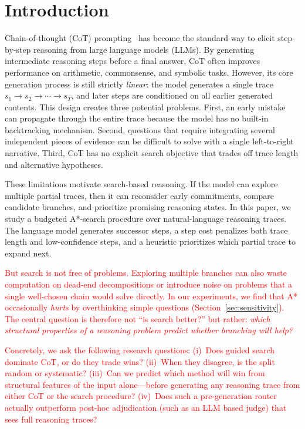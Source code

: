 \documentclass[11pt]{article}
\begin{document}
\section{Introduction}
\label{sec:intro}

Chain-of-thought (CoT) prompting~\cite{wei2022chain} has become the standard way to elicit step-by-step reasoning from large language models (LLMs). By generating intermediate reasoning steps before a final answer, CoT often improves performance on arithmetic, commonsense, and symbolic tasks. However, its core generation process is still strictly \emph{linear}: the model generates a single trace $s_1 \rightarrow s_2 \rightarrow \cdots \rightarrow s_T$, and later steps are conditioned on all earlier generated contents. This design creates three potential problems. First, an early mistake can propagate through the entire trace because the model has no built-in backtracking mechanism. Second, questions that require integrating several independent pieces of evidence can be difficult to solve with a single left-to-right narrative. Third, CoT has no explicit search objective that trades off trace length and alternative hypotheses.

These limitations motivate search-based reasoning. If the model can explore multiple partial traces, then it can reconsider early commitments, compare candidate branches, and prioritize promising reasoning states. In this paper, we study a budgeted A*-search procedure over natural-language reasoning traces. The language model generates successor steps, a step cost penalizes both trace length and low-confidence steps, and a heuristic prioritizes which partial trace to expand next.

\textcolor{red}{But search is not free of problems. Exploring multiple branches can also waste computation on dead-end decompositions or introduce noise on problems that a single well-chosen chain would solve directly. In our experiments, we find that A* occasionally \emph{hurts} by overthinking simple questions (Section~\ref{sec:sensitivity}). The central question is therefore not ``is search better?'' but rather: \emph{which structural properties of a reasoning problem predict whether branching will help?}}

\textcolor{red}{Concretely, we ask the following research questions: (i)~Does guided search dominate CoT, or do they trade wins? (ii)~When they disagree, is the split random or systematic? (iii)~Can we predict which method will win from structural features of the input alone---before generating any reasoning trace from either CoT or the search procedure? (iv)~Does such a pre-generation router actually outperform post-hoc adjudication (such as an LLM based judge) that sees full reasoning traces?}
\end{document}
